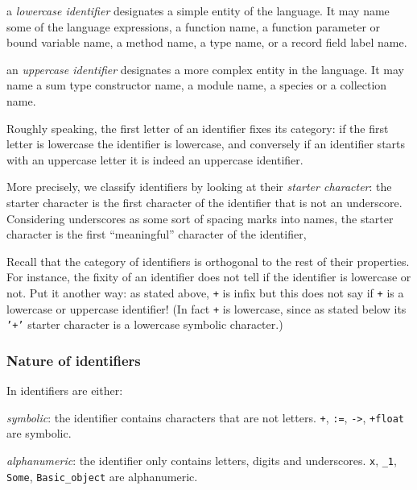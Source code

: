 \begin{citemize}

\item a {\em lowercase identifier} designates a simple entity of the
  language. It may name some of the language expressions, a function name, a
  function parameter or bound variable name, a method name, a type name, or a
  record field label name.

\item an {\em uppercase identifier} designates a more complex entity in the
  language. It may name a sum type constructor name, a module name, a species
  or a collection name.

\end{citemize}

Roughly speaking, the first letter of an identifier fixes its category:
if the first letter is lowercase the identifier is lowercase, and conversely
if an identifier starts with an uppercase letter it is indeed an uppercase identifier.

More precisely, we classify identifiers by looking at their
{\em starter character}: the starter character is the first character of the identifier
that is not an underscore. Considering underscores as some sort of spacing
marks into names, the starter character is the first ``meaningful'' character
of the identifier,

Recall that the category of identifiers is orthogonal to the rest of their
properties. For instance, the fixity of an identifier does not tell if the
identifier is lowercase or not. Put it another way: as stated above, {\tt +}
is infix but this does not say if {\tt +} is a lowercase or uppercase
identifier! (In fact {\tt +} is lowercase, since as stated below its {\tt
  '+'} starter character is a lowercase symbolic character.)

\subsubsection{Nature of identifiers}

In {\focal} identifiers are either:

\begin{citemize}
\item {\em symbolic}: the identifier contains characters that are not
  letters. {\tt +}, {\tt :=}, {\tt ->}, {\tt +float} are symbolic.

\item {\em alphanumeric}: the identifier only contains letters, digits and
  underscores. {\tt x}, {\tt \_1}, {\tt Some}, {\tt Basic\_object} are
  alphanumeric.
\end{citemize}

